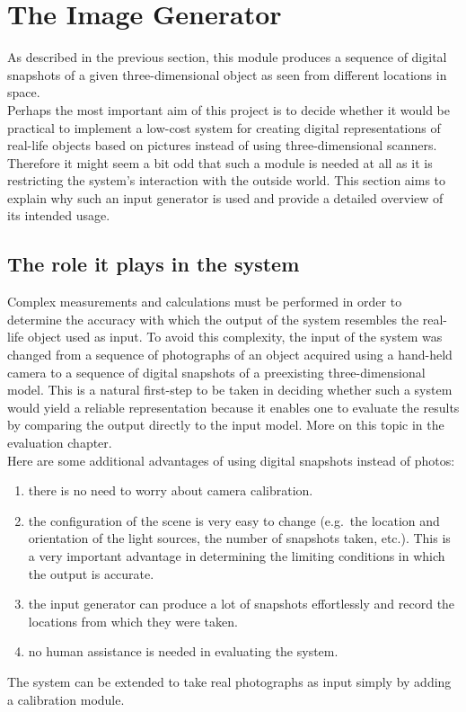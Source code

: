 \documentclass[12pt,a4paper,twoside,openright]{report}
\begin{document}
\section{The Image Generator}
As described in the previous section, this module produces a sequence of digital snapshots of a given three-dimensional object as seen from different locations in space. \\
Perhaps the most important aim of this project is to decide whether it would be practical to implement a low-cost system for creating digital representations of real-life objects based on pictures instead of using three-dimensional scanners. Therefore it might seem a bit odd that such a module is needed at all as it is restricting the system's interaction with the outside world. This section aims to explain why such an input generator is used and provide a detailed overview of its intended usage. 
\subsection{The role it plays in the system}
Complex measurements and calculations must be performed in order to determine the accuracy with which the output of the system resembles the real-life object used as input. To avoid this complexity, the input of the system was changed from a sequence of photographs of an object acquired using a hand-held camera to a sequence of digital snapshots of a preexisting three-dimensional model. This is a natural first-step to be taken in deciding whether such a system would yield a reliable representation because it enables one to evaluate the results by comparing the output directly to the input model. More on this topic in the evaluation chapter.\\
Here are some additional advantages of using digital snapshots instead of photos: 
\begin{enumerate}
\item there is no need to worry about camera calibration.
\item the configuration of the scene is very easy to change (e.g.\ the location and orientation of the light sources, the number of snapshots taken, etc.). This is a very important advantage in determining the limiting conditions in which the output is accurate.
\item the input generator can produce a lot of snapshots effortlessly and record the locations from which they were taken.
\item no human assistance is needed in evaluating the system.
\end{enumerate}
The system can be extended to take real photographs as input simply by adding a calibration module.
\end{document}
